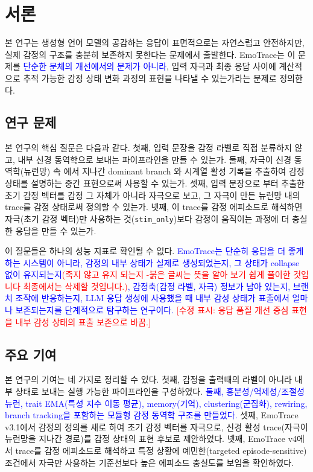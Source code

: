 ﻿\documentclass[11pt,a4paper]{article}
\newcommand{\eng}[1]{\texttt{#1}}
\begin{document}
\tableofcontents
\newpage

\section{서론}

본 연구는 생성형 언어 모델의 공감하는 응답이 표면적으로는 자연스럽고 안전하지만, 실제 감정의  구조를 충분히 보존하지 못한다는 문제에서 출발한다. EmoTrace는 이 문제를 \textcolor{blue}{단순한 문체의 개선에서의 문제가 아니라}, 입력 자극과 최종 응답 사이에 계산적으로 추적 가능한 감정 상태 변화 과정의 표현을 나타낼 수 있는가라는 문제로 정의한다.

\subsection{연구 문제}

본 연구의 핵심 질문은 다음과 같다. 첫째, 입력 문장을 감정 라벨로 직접 분류하지 않고, 내부 신경 동역학으로 보내는 파이프라인을 만들 수 있는가. 둘째, 자극이 신경 동역학(뉴런망) 속 에서 지나간 dominant branch 와 시계열 활성 기록을 추출하여 감정 상태를 설명하는 중간 표현으로써 사용할 수 있는가. 셋째, 입력 문장으로 부터 추출한 초기 감정 벡터를 감정 그 자체가 아니라 자극으로 보고, 그 자극이 만든 뉴런망 내의 trace를 감정 상태로써 정의할 수 있는가. 넷째, 이 trace를 감정 에피소드로 해석하면 자극(초기 감정 벡터)만 사용하는 것(\eng{stim\_only})보다 감정이 움직이는 과정에 더 충실한 응답을 만들 수 있는가.

이 질문들은 하나의 성능 지표로 확인될 수 없다. \textcolor{blue}{EmoTrace는 \textcolor{blue}{단순히 응답을 더 좋게 하는 시스템이 아니라}, 감정의 내부 상태가 실제로 생성되었는지, 그 상태가 collapse 없이 유지되는지\textcolor{red}{(죽지 않고 유지 되는지 -붉은 글씨는 뜻을 알아 보기 쉽게 풀이한 것입니다 최종에서는 삭제할 것입니다.)}, 감정축(감정 라벨, 자극) 정보가 남아 있는지, 브랜치 조작에 반응하는지, LLM 응답 생성에 사용했을 때 내부 감성 상태가 표출에서 얼마나 보존되는지를 단계적으로 탐구하는 연구이다.} \textcolor{red}{[수정 표시: 응답 품질 개선 중심 표현을 내부 감성 상태의 표출 보존으로 바꿈.]}

\subsection{주요 기여}

본 연구의 기여는 네 가지로 정리할 수 있다. 첫째, 감정을 출력때의 라벨이 아니라 내부 상태로 보내는 실행 가능한 파이프라인을 구성하였다. \textcolor{blue}{둘째, 흥분성/억제성/조절성 뉴런, trait EMA(특성 지수 이동 평균), memory(기억), clustering(군집화), rewiring, branch tracking을 포함하는 모듈형 감정 동역학 구조를 만들었다.} 셋째, EmoTrace v3.1에서 감정의 정의를 새로 하여 초기 감정 벡터를 자극으로, 신경 활성 trace(자극이 뉴런망을 지나간 경로)를 감정 상태의 표현 후보로 제안하였다. 넷째, EmoTrace v4에서 trace를 감정 에피소드로 해석하고 특정 상황에 예민한(targeted episode-sensitive) 조건에서 자극만 사용하는 기준선보다 높은 에피소드 충실도를 보임을 확인하였다.
\end{document}
